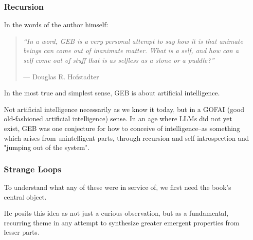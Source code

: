 \documentclass[aspectratio=169]{beamer}
\begin{document}
\begin{frame}[fragile]
\frametitle{Recursion}
  In the words of the author himself:
  \vspace{10pt}

  \begin{quote}
    \textit{``In a word, GEB is a very personal attempt to say how
    it is that animate beings can come out of inanimate
    matter. What is a self, and how can a self come out
    of stuff that is as selfless as a stone or a puddle?''}

    \vspace{6pt}
    \hfill {\normalfont\small --- Douglas R. Hofstadter}
  \end{quote}

  In the most true and simplest sense, GEB is about artificial intelligence.

  \pause
  \vspace{\fill}

  Not artificial intelligence necessarily as we know it today, but in a
  GOFAI (good old-fashioned artificial intelligence) sense. In an age
  where LLMs did not yet exist, GEB was one conjecture for how to
  conceive of intelligence--as something which arises from unintelligent
  parts, through recursion and self-introspection and "jumping out of the
  system".
\end{frame}

\begin{frame}[fragile]
  \frametitle{Strange Loops}


  To understand what any of these were in service of, we first need
  the book's central object.

  \pause
  \vspace{\fill}


  \pause
  \vspace{\fill}

  He posits this idea as not just a curious observation, but as a fundamental,
  recurring theme in any attempt to synthesize greater emergent properties
  from lesser parts.
\end{frame}
\end{document}
